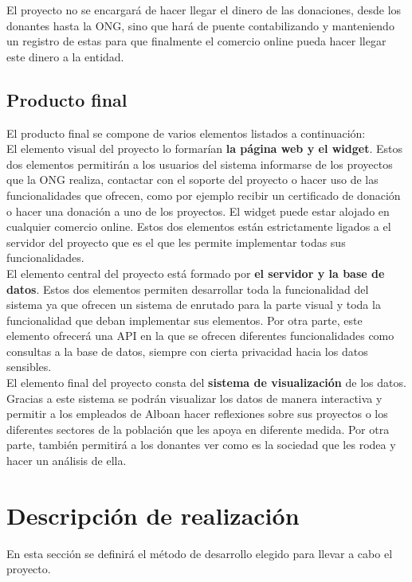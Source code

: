 El proyecto no se encargará de hacer llegar el dinero de las donaciones, desde los donantes hasta la ONG, sino que hará de puente contabilizando y manteniendo un registro de estas para que finalmente el comercio online pueda hacer llegar este dinero a la entidad.

\subsection{Producto final}
El producto final se compone de varios elementos listados a continuación:\\

El elemento visual del proyecto lo formarían \textbf{la página web y el widget}. Estos dos elementos permitirán a los usuarios del sistema informarse de los proyectos que la ONG realiza, contactar con el soporte del proyecto o hacer uso de las funcionalidades que ofrecen, como por ejemplo recibir un certificado de donación o hacer una donación a uno de los proyectos. El widget puede estar alojado en cualquier comercio online. Estos dos elementos están estrictamente ligados a el servidor del proyecto que es el que les permite implementar todas sus funcionalidades.\\

El elemento central del proyecto está formado por \textbf{el servidor y la base de datos}. Estos dos elementos permiten desarrollar toda la funcionalidad del sistema ya que ofrecen un sistema de enrutado para la parte visual y toda la funcionalidad que deban implementar sus elementos. Por otra parte, este elemento ofrecerá una API en la que se ofrecen diferentes funcionalidades como consultas a la base de datos, siempre con cierta privacidad hacia los datos sensibles.\\

El elemento final del proyecto consta del \textbf{sistema de visualización} de los datos. Gracias a este sistema se podrán visualizar los datos de manera interactiva y permitir a los empleados de Alboan hacer reflexiones sobre sus proyectos o los diferentes sectores de la población que les apoya en diferente medida. Por otra parte, también permitirá a los donantes ver como es la sociedad que les rodea y hacer un análisis de ella.

\section{Descripción de realización}
En esta sección se definirá el método de desarrollo elegido para llevar a cabo el proyecto.
